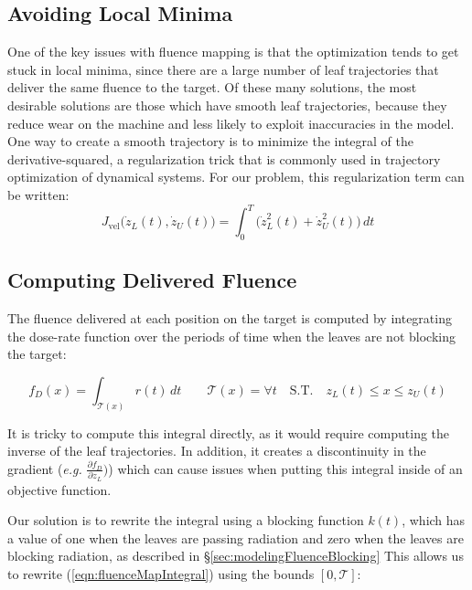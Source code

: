 \subsection{Avoiding Local Minima}

One of the key issues with fluence mapping is that the
optimization tends to get stuck in local minima,
since there are a large number of leaf trajectories that deliver the same fluence to the target.
Of these many solutions, the most desirable solutions are those which have smooth leaf trajectories,
because they reduce wear on the machine and less likely to exploit inaccuracies in the model.
One way to create a smooth trajectory is to minimize the integral of the derivative-squared,
a regularization trick that is commonly used in trajectory optimization of dynamical systems.
For our problem, this regularization term can be written:
\begin{equation}
  J_\text{vel}\big(\dot{z}_L(t), \dot{z}_U(t)\big)
    = \int_0^T \! \big( \dot{z}_L^2(t) + \dot{z}_U^2(t) \big) \,dt
\end{equation}

\subsection{Computing Delivered Fluence}

The fluence delivered at each position on the target is computed by integrating the
dose-rate function over the periods of time when the leaves are not blocking the target:

\begin{equation}
  f_D(x) = \int_{\mathcal{T}(x)} \! r(t) \,dt
  \quad \quad
  \mathcal{T}(x) = \forall t
  \quad
  \text{S.T.}
  \quad
  z_L(t) \leq x \leq z_U(t)
  \label{eqn:fluenceMapIntegral}
\end{equation}

It is tricky to compute this integral directly, as it would require computing
the inverse of the leaf trajectories.
In addition, it creates a discontinuity in the gradient
(\textit{e.g.} $\tfrac{\partial f_D}{\partial z_L})$)
which can cause issues when putting this integral inside of an objective function.

Our solution is to rewrite the integral using a blocking function $k(t)$,
which has a value of one when the leaves are passing radiation and
zero when the leaves are blocking radiation, as described in \S\ref{sec:modelingFluenceBlocking}
This allows us to rewrite (\ref{eqn:fluenceMapIntegral}) using the bounds $[0, \mathcal{T}]$:

